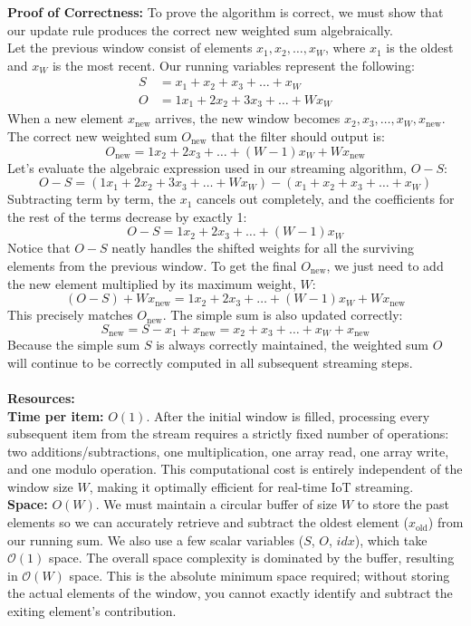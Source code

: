 \documentclass[11pt]{article}
\begin{document}
\newpage

\textbf{Proof of Correctness:}
To prove the algorithm is correct, we must show that our update rule produces the correct new weighted sum algebraically.\\
Let the previous window consist of elements $x_1, x_2, \dots, x_W$, where $x_1$ is the oldest and $x_W$ is the most recent. Our running variables represent the following:
\begin{align*}
    S &= x_1 + x_2 + x_3 + \dots + x_W \\
    O &= 1x_1 + 2x_2 + 3x_3 + \dots + Wx_W
\end{align*}
When a new element $x_{\text{new}}$ arrives, the new window becomes $x_2, x_3, \dots, x_W, x_{\text{new}}$. The correct new weighted sum $O_{\text{new}}$ that the filter should output is:
\[
O_{\text{new}} = 1x_2 + 2x_3 + \dots + (W-1)x_W + Wx_{\text{new}}
\]
Let's evaluate the algebraic expression used in our streaming algorithm, $O - S$:
\[
O - S = (1x_1 + 2x_2 + 3x_3 + \dots + Wx_W) - (x_1 + x_2 + x_3 + \dots + x_W)
\]
Subtracting term by term, the $x_1$ cancels out completely, and the coefficients for the rest of the terms decrease by exactly 1:
\[
O - S = 1x_2 + 2x_3 + \dots + (W-1)x_W
\]
Notice that $O - S$ neatly handles the shifted weights for all the surviving elements from the previous window. To get the final $O_{\text{new}}$, we just need to add the new element multiplied by its maximum weight, $W$:
\[
(O - S) + Wx_{\text{new}} = 1x_2 + 2x_3 + \dots + (W-1)x_W + Wx_{\text{new}}
\]
This precisely matches $O_{\text{new}}$. The simple sum is also updated correctly:
\[
S_{\text{new}} = S - x_1 + x_{\text{new}} = x_2 + x_3 + \dots + x_W + x_{\text{new}}
\]
Because the simple sum $S$ is always correctly maintained, the weighted sum $O$ will continue to be correctly computed in all subsequent streaming steps.\\ \\
\textbf{Resources: }\\
\textbf{Time per item:} $O(1)$. After the initial window is filled, processing every subsequent item from the stream requires a strictly fixed number of operations: two additions/subtractions, one multiplication, one array read, one array write, and one modulo operation. This computational cost is entirely independent of the window size $W$, making it optimally efficient for real-time IoT streaming.\\
\textbf{Space:} $O(W)$. We must maintain a circular buffer of size $W$ to store the past elements so we can accurately retrieve and subtract the oldest element ($x_{\text{old}}$) from our running sum. We also use a few scalar variables ($S$, $O$, $\textit{idx}$), which take $\mathcal{O}(1)$ space. The overall space complexity is dominated by the buffer, resulting in $\mathcal{O}(W)$ space. This is the absolute minimum space required; without storing the actual elements of the window, you cannot exactly identify and subtract the exiting element's contribution.\\
\end{document}

